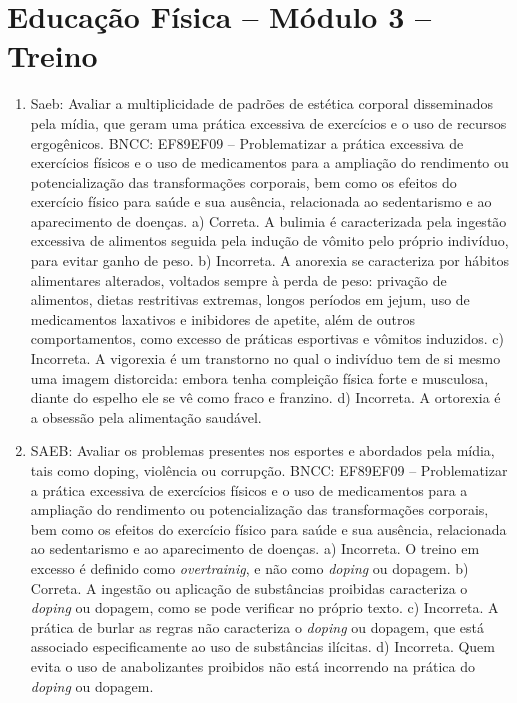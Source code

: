 \section*{Educação Física – Módulo 3 –  Treino}

\begin{enumerate}
\item
Saeb: Avaliar a multiplicidade de padrões de estética corporal
disseminados pela mídia, que geram uma prática excessiva de exercícios e
o uso de recursos ergogênicos.
BNCC: EF89EF09 -- Problematizar a prática excessiva de exercícios físicos
e o uso de medicamentos para a ampliação do rendimento ou
potencialização das transformações corporais, bem como os efeitos do
exercício físico para saúde e sua ausência, relacionada ao sedentarismo
e ao aparecimento de doenças.
a) Correta. A bulimia é caracterizada pela ingestão excessiva de alimentos
seguida pela indução de vômito pelo próprio indivíduo, para evitar
ganho de peso.
b) Incorreta. A anorexia se caracteriza por hábitos alimentares 
alterados, voltados sempre à perda de peso: privação de alimentos, 
dietas restritivas extremas, longos períodos em jejum, uso de 
medicamentos laxativos e inibidores de apetite, além de outros 
comportamentos, como excesso de práticas esportivas e vômitos
induzidos. 
c) Incorreta. A vigorexia é um transtorno no qual o indivíduo
tem de si mesmo uma imagem distorcida: embora tenha compleição
física forte e musculosa, diante do espelho ele se vê como fraco
e franzino.
d) Incorreta. A ortorexia é a obsessão pela alimentação saudável.

\item
SAEB: Avaliar os problemas presentes nos esportes e abordados pela
mídia, tais como doping, violência ou corrupção.
BNCC: EF89EF09 -- Problematizar a prática excessiva de exercícios físicos
e o uso de medicamentos para a ampliação do rendimento ou
potencialização das transformações corporais, bem como os efeitos do
exercício físico para saúde e sua ausência, relacionada ao sedentarismo
e ao aparecimento de doenças.
a) Incorreta. O treino em excesso é definido como \textit{overtrainig},
e não como \textit{doping} ou dopagem.
b) Correta. A ingestão ou aplicação de substâncias proibidas caracteriza
o \textit{doping} ou dopagem, como se pode verificar no próprio texto.
c) Incorreta. A prática de burlar as regras não caracteriza o 
\textit{doping} ou dopagem, que está associado especificamente ao uso
de substâncias ilícitas. 
d) Incorreta. Quem evita o uso de anabolizantes proibidos não está
incorrendo na prática do \textit{doping} ou dopagem.


\end{enumerate}
